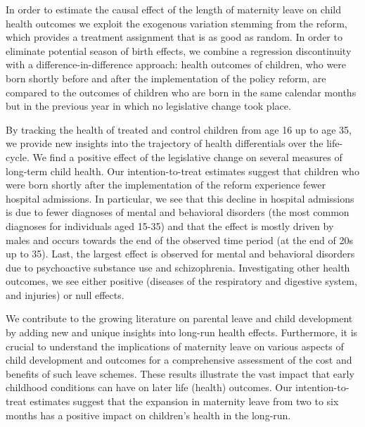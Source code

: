 \documentclass[11pt, a4paper]{article} %
\begin{document}
In order to estimate the causal effect of the length of maternity leave on child health outcomes we exploit the exogenous variation stemming from the reform, which provides a treatment assignment that is as good as random. In order to eliminate potential season of birth effects, we combine a regression discontinuity with a difference-in-difference approach: health outcomes of children, who were born shortly before and after the implementation of the policy reform, are compared to the outcomes of children who are born in the same calendar months but in the previous year in which no legislative change took place.\newline

By tracking the health of treated and control children from age 16 up to age 35, we provide new insights into the trajectory of health differentials over the life-cycle.
We find a positive effect of the legislative change on several measures of long-term child health. Our intention-to-treat estimates suggest that children who were born shortly after the implementation of the reform experience fewer hospital admissions.
In particular, we see that this decline in hospital admissions is due to fewer diagnoses of mental and behavioral disorders (the most common diagnoses for individuals aged 15-35) and that the effect is mostly driven by males and occurs towards the end of the observed time period (at the end of 20s up to 35). Last, the largest effect is observed for mental and behavioral disorders due to psychoactive substance use and schizophrenia. 
Investigating other health outcomes, we see either positive (diseases of the respiratory and digestive system, and injuries) or null effects. \newline



We contribute to the growing literature on parental leave and child development by adding new and unique insights into long-run health effects. Furthermore, it is crucial to understand the implications of maternity leave on various aspects of child development and outcomes for a comprehensive assessment of the cost and benefits of such leave schemes. These results illustrate the vast impact that early childhood conditions can have on later life (health) outcomes. Our intention-to-treat estimates suggest that the expansion in maternity leave from two to six months has a positive impact on children’s health in the long-run.
\end{document}
